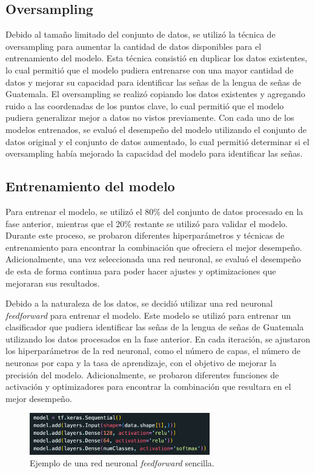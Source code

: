 \subsection{Oversampling}
Debido al tamaño limitado del conjunto de datos, se utilizó la técnica de oversampling para aumentar la cantidad de datos disponibles para el entrenamiento del modelo.
Esta técnica consistió en duplicar los datos existentes, lo cual permitió que el modelo pudiera entrenarse con una mayor cantidad de datos y mejorar su capacidad para identificar las señas de la lengua de señas de Guatemala.
El oversampling se realizó copiando los datos existentes y agregando ruido a las coordenadas de los puntos clave, lo cual permitió que el modelo pudiera generalizar mejor a datos no vistos previamente.
Con cada uno de los modelos entrenados, se evaluó el desempeño del modelo utilizando el conjunto de datos original y el conjunto de datos aumentado, lo cual permitió determinar si el oversampling había mejorado la capacidad del modelo para identificar las señas.

\subsection{Entrenamiento del modelo}
Para entrenar el modelo, se utilizó el 80\% del conjunto de datos procesado en la fase anterior, mientras que el 20\% restante se utilizó para validar el modelo.
Durante este proceso, se probaron diferentes hiperparámetros y técnicas de entrenamiento para encontrar la combinación que ofreciera el mejor desempeño.
Adicionalmente, una vez seleccionada una red neuronal, se evaluó el desempeño de esta de forma continua para poder hacer ajustes y optimizaciones que mejoraran sus resultados.  

Debido a la naturaleza de los datos, se decidió utilizar una red neuronal \textit{feedforward} para entrenar el modelo.
Este modelo se utilizó para entrenar un clasificador que pudiera identificar las señas de la lengua de señas de Guatemala utilizando los datos procesados en la fase anterior.
En cada iteración, se ajustaron los hiperparámetros de la red neuronal, como el número de capas, el número de neuronas por capa y la tasa de aprendizaje, con el objetivo de mejorar la precisión del modelo.
Adicionalmente, se probaron diferentes funciones de activación y optimizadores para encontrar la combinación que resultara en el mejor desempeño.

\begin{figure}[H]
    \centering
    \includegraphics[width=0.7\textwidth]{figuras/FNN.png}
    \caption{Ejemplo de una red neuronal \textit{feedforward} sencilla.}
    \label{fig:feedforward}
\end{figure}

